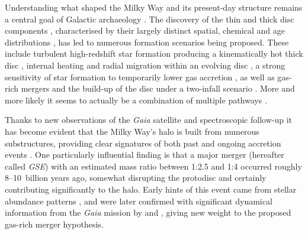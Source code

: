 \documentclass[fleqn,usenatbib]{mnras}
\begin{document}
Understanding what shaped the Milky Way and its present-day structure remains a central goal of Galactic archaeology \citep{FreemanBlandHawthorn2002,BlandHawthorn_Gerhard2016}. The discovery of the thin and thick disc components \citep{Yoshii1982, Gilmore1983}, characterised by their largely distinct spatial, chemical and age distributions \citep[for example][]{Bensby2014, Hayden2015}, has led to numerous formation scenarios being proposed. These include turbulent high-redshift star formation producing a kinematically hot thick disc \citep{Bird2013, Stinson2013}, internal heating and radial migration within an evolving disc \citep{Schoenrich2009, Minchev2013, Sharma2021b}, a strong sensitivity of star formation to temporarily lower gas accretion \citep{Grand2018, Orkney2025}, as well as gas-rich mergers \citep{Brook2004, Buck2020} and the build-up of the disc under a two-infall scenario \citep{Chiappini1997, Spitoni2019}. More and more likely it seems to actually be a combination of multiple pathways \citep[e.g.][]{Orkney2025}.

Thanks to new observations of the \textit{Gaia} satellite \citep{Brown2021b} and spectroscopic follow-up it has become evident that the Milky Way's halo is built from numerous substructures, providing clear signatures of both past and ongoing accretion events \citep{Belokurov2006, Myeong2018c, Koppelman2019, Naidu2020, Yuan2020, Dodd2023}. One particularly influential finding is that a major merger (hereafter called \textit{GSE}) with an estimated mass ratio between 1:2.5 and 1:4 \citep{Helmi2018, Naidu2020} occurred roughly 8–10~billion years ago, somewhat disrupting the protodisc and certainly contributing significantly to the halo. Early hints of this event came from stellar abundance patterns \citep{Nissen2010}, and were later confirmed with significant dynamical information from the \textit{Gaia} mission \citep{Brown2016, Brown2018} by \citet{Belokurov2018} and \citet{Helmi2018}, giving new weight to the proposed gas-rich merger hypothesis.
\end{document}
